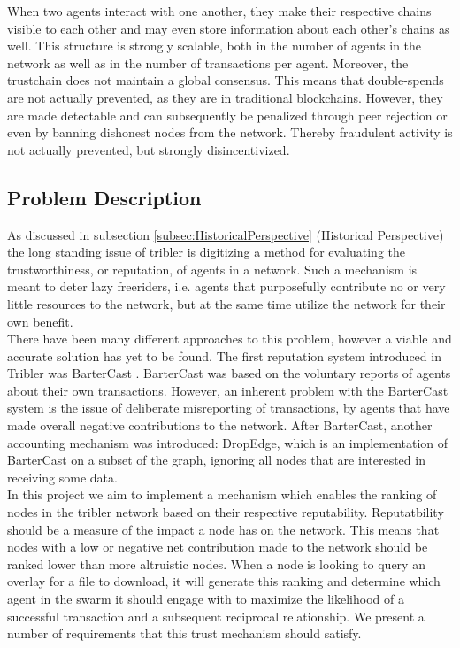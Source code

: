\documentclass[sigconf]{acmart}
\theoremstyle{definition}
\begin{document}
\noindent When two agents interact with one another, they make their respective chains visible to each other and may even store information about each other's chains as well. This structure is strongly scalable, both in the number of agents in the network as well as in the number of transactions per agent. Moreover, the trustchain does not maintain a global consensus. This means that double-spends are not actually prevented, as they are in traditional blockchains. However, they are made detectable and can subsequently be penalized through peer rejection or even by banning dishonest nodes from the network. Thereby fraudulent activity is not actually prevented, but strongly disincentivized.

\subsection{Problem Description}
\label{subsec:ProblemDescription}
As discussed in subsection \ref{subsec:HistoricalPerspective} (Historical Perspective) the long standing issue of tribler is digitizing a method for evaluating the trustworthiness, or reputation, of agents in a network. Such a mechanism is meant to deter lazy freeriders, i.e. agents that purposefully contribute no or very little resources to the network, but at the same time utilize the network for their own benefit. \vspace{1em}\\

\noindent There have been many different approaches to this problem, however a viable and accurate solution has yet to be found. The first reputation system introduced in Tribler was BarterCast \citep{Bartercast: A practical approach to prevent lazy freeriding in p2p networks}. BarterCast was based on the voluntary reports of agents about their own transactions. However, an inherent problem with the BarterCast system is the issue of deliberate misreporting of transactions, by agents that have made overall negative contributions to the network. After BarterCast, another accounting mechanism was introduced: DropEdge, which is an implementation of BarterCast on a subset of the graph, ignoring all nodes that are interested in receiving some data. \vspace{1em}\\

\noindent In this project we aim to implement a mechanism which enables the ranking of nodes in the tribler network based on their respective reputability. Reputatbility should be a measure of the impact a node has on the network. This means that nodes with a low or negative net contribution made to the network should be ranked lower than more altruistic nodes. When a node is looking to query an overlay for a file to download, it will generate this ranking and determine which agent in the swarm it should engage with to maximize the likelihood of a successful transaction and a subsequent reciprocal relationship. We present a number of requirements that this trust mechanism should satisfy.
\end{document}
